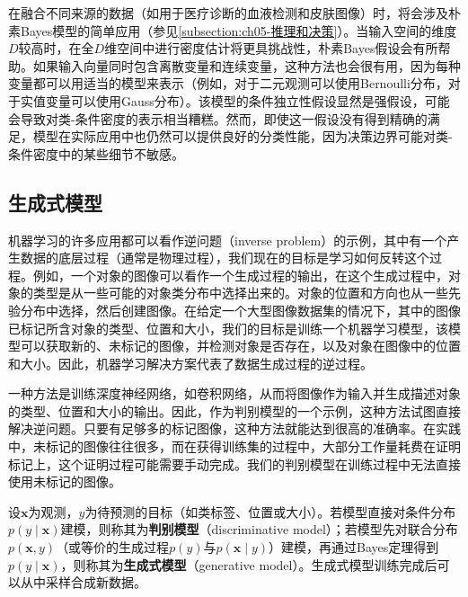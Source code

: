 \documentclass[../../main.tex]{subfiles}
\begin{document}
在融合不同来源的数据（如用于医疗诊断的血液检测和皮肤图像）时，将会涉及朴素Bayes模型的简单应用（参见\cref{subsection:ch05-推理和决策}）。当输入空间的维度$D$较高时，在全$D$维空间中进行密度估计将更具挑战性，朴素Bayes假设会有所帮助。如果输入向量同时包含离散变量和连续变量，这种方法也会很有用，因为每种变量都可以用适当的模型来表示（例如，对于二元观测可以使用Bernoulli分布，对于实值变量可以使用Gauss分布）。该模型的条件独立性假设显然是强假设，可能会导致对类-条件密度的表示相当糟糕。然而，即使这一假设没有得到精确的满足，模型在实际应用中也仍然可以提供良好的分类性能，因为决策边界可能对类-条件密度中的某些细节不敏感。

\subsection{生成式模型}\label{subsection:ch11-生成式模型}

机器学习的许多应用都可以看作逆问题（inverse problem）的示例，其中有一个产生数据的底层过程（通常是物理过程），我们现在的目标是学习如何反转这个过程。例如，一个对象的图像可以看作一个生成过程的输出，在这个生成过程中，对象的类型是从一些可能的对象类分布中选择出来的。对象的位置和方向也从一些先验分布中选择，然后创建图像。在给定一个大型图像数据集的情况下，其中的图像已标记所含对象的类型、位置和大小，我们的目标是训练一个机器学习模型，该模型可以获取新的、未标记的图像，并检测对象是否存在，以及对象在图像中的位置和大小。因此，机器学习解决方案代表了数据生成过程的逆过程。

一种方法是训练深度神经网络，如卷积网络，从而将图像作为输入并生成描述对象的类型、位置和大小的输出。因此，作为判别模型的一个示例，这种方法试图直接解决逆问题。只要有足够多的标记图像，这种方法就能达到很高的准确率。在实践中，未标记的图像往往很多，而在获得训练集的过程中，大部分工作量耗费在证明标记上，这个证明过程可能需要手动完成。我们的判别模型在训练过程中无法直接使用未标记的图像。

\begin{definition}[判别模型与生成式模型]\label{definition:ch11-生成式模型}
设$\mathbf{x}$为观测，$y$为待预测的目标（如类标签、位置或大小）。若模型直接对条件分布$p(y\mid\mathbf{x})$建模，则称其为\textbf{判别模型}（discriminative model）；若模型先对联合分布$p(\mathbf{x},y)$（或等价的生成过程$p(y)$与$p(\mathbf{x}\mid y)$）建模，再通过Bayes定理得到$p(y\mid\mathbf{x})$，则称其为\textbf{生成式模型}（generative model）。生成式模型训练完成后可以从中采样合成新数据。
\end{definition}
\end{document}
